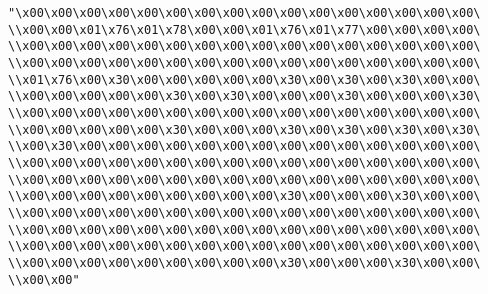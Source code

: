 \verb|"\x00\x00\x00\x00\x00\x00\x00\x00\x00\x00\x00\x00\x00\x00\x00\x00\|\newline
\verb|\\x00\x00\x01\x76\x01\x78\x00\x00\x01\x76\x01\x77\x00\x00\x00\x00\|\newline
\verb|\\x00\x00\x00\x00\x00\x00\x00\x00\x00\x00\x00\x00\x00\x00\x00\x00\|\newline
\verb|\\x00\x00\x00\x00\x00\x00\x00\x00\x00\x00\x00\x00\x00\x00\x00\x00\|\newline
\verb|\\x01\x76\x00\x30\x00\x00\x00\x00\x00\x30\x00\x30\x00\x30\x00\x00\|\newline
\verb|\\x00\x00\x00\x00\x00\x30\x00\x30\x00\x00\x00\x30\x00\x00\x00\x30\|\newline
\verb|\\x00\x00\x00\x00\x00\x00\x00\x00\x00\x00\x00\x00\x00\x00\x00\x00\|\newline
\verb|\\x00\x00\x00\x00\x00\x30\x00\x00\x00\x30\x00\x30\x00\x30\x00\x30\|\newline
\verb|\\x00\x30\x00\x00\x00\x00\x00\x00\x00\x00\x00\x00\x00\x00\x00\x00\|\newline
\verb|\\x00\x00\x00\x00\x00\x00\x00\x00\x00\x00\x00\x00\x00\x00\x00\x00\|\newline
\verb|\\x00\x00\x00\x00\x00\x00\x00\x00\x00\x00\x00\x00\x00\x00\x00\x00\|\newline
\verb|\\x00\x00\x00\x00\x00\x00\x00\x00\x00\x30\x00\x00\x00\x30\x00\x00\|\newline
\verb|\\x00\x00\x00\x00\x00\x00\x00\x00\x00\x00\x00\x00\x00\x00\x00\x00\|\newline
\verb|\\x00\x00\x00\x00\x00\x00\x00\x00\x00\x00\x00\x00\x00\x00\x00\x00\|\newline
\verb|\\x00\x00\x00\x00\x00\x00\x00\x00\x00\x00\x00\x00\x00\x00\x00\x00\|\newline
\verb|\\x00\x00\x00\x00\x00\x00\x00\x00\x00\x30\x00\x00\x00\x30\x00\x00\|\newline
\verb|\\x00\x00"|\newline
